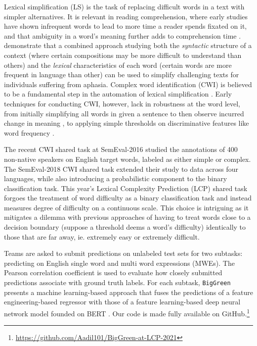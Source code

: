 \documentclass{dcthesis}
\theoremstyle{definition}
\theoremstyle{remark}
\begin{document}
Lexical simplification (LS) is the task of replacing difficult words in a text with simpler alternatives. It is relevant in reading comprehension, where early studies have shown infrequent words to lead to more time a reader spends fixated on it, and that ambiguity in a word's meaning further adds to comprehension time \citep{rayner1986lexical}. \citet{devlin1999simplifying} demonstrate that a combined approach studying both the \textit{syntactic} structure of a context (where certain compositions may be more difficult to understand than others) and the \textit{lexical} characteristics of each word (certain words are more frequent in language than other) can be used to simplify challenging texts for individuals suffering from aphasia. Complex word identification (CWI) is believed to be a fundamental step in the automation of lexical simplification \citep{shardlow2014out}. 
Early techniques for conducting CWI, however, lack in robustness at the word level, from initially simplifying all words in given a sentence to then observe incurred change in meaning \citep{devlin1998use}, to applying simple thresholds on discriminative features like word frequency \citep{zeng2005text}.

The recent CWI shared task at SemEval-2016 \citep{paetzold2016semeval} studied the annotations of 400 non-native speakers on English target words, labeled as either simple or complex. The SemEval-2018 CWI shared task \citep{yimam2018report} extended their study to data across four languages, while also introducing a probabilistic component to the binary classification task. This year's Lexical Complexity Prediction (LCP) shared task \citep{shardlow2021semeval} forgoes the treatment of word difficulty as a binary classification task \citep{paetzold2016semeval, yimam2018report} and instead measures degree of difficulty on a continuous scale. This choice is intriguing as it mitigates a dilemma with previous approaches of having to treat words close to a decision boundary (suppose a threshold deems a word's difficulty) identically to those that are far away, ie. extremely easy or extremely difficult.

Teams are asked to submit predictions on unlabeled test sets for two subtasks: predicting on English single word and multi word expressions (MWEs). The Pearson correlation coefficient is used to evaluate how closely submitted predictions associate with ground truth labels. For each subtask, \texttt{BigGreen} presents a machine learning-based approach that fuses the predictions of a feature engineering-based regressor with those of a feature learning-based deep neural network model founded on BERT \citep{devlin2018bert}. Our code is made fully available on GitHub.\footnote{\url{https://github.com/Aadil101/BigGreen-at-LCP-2021}}
\end{document}
